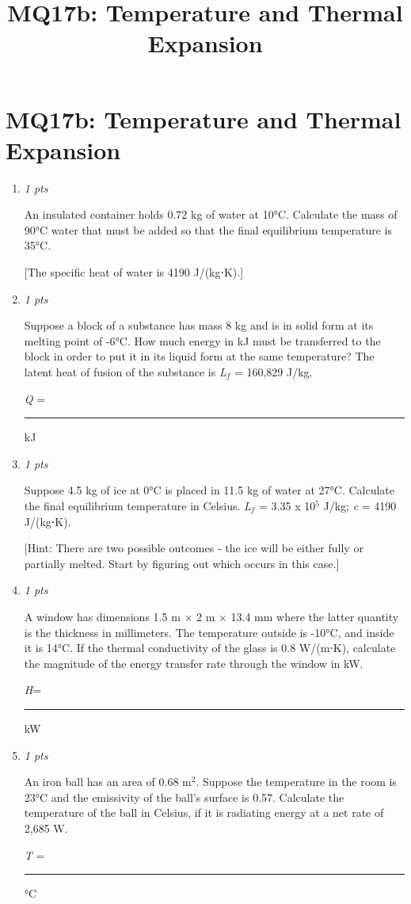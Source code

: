 \documentclass[11pt]{article}
\title{MQ17b: Temperature and Thermal Expansion}
\author{}
\date{}
\begin{document}
\maketitle

\section*{MQ17b: Temperature and Thermal Expansion}

\begin{enumerate}[leftmargin=*,label=\textbf{Question \arabic*.}]

\item \hfill \textit{1 pts}

An insulated container holds 0.72 kg of water at 10°C. Calculate the mass of 90°C water that must be added so that the final equilibrium temperature is 35°C.

[The specific heat of water is 4190 J/(kg⋅K).]

\item \hfill \textit{1 pts}

Suppose a block of a substance has mass 8 kg and is in solid form at its melting point of -6°C. How much energy in kJ must be transferred to the block in order to put it in its liquid form at the same temperature? The latent heat of fusion of the substance is \emph{L}$_{f}$ = 160,829 J/kg.



\emph{Q} = \rule{2.5cm}{0.4pt} kJ

\item \hfill \textit{1 pts}

Suppose 4.5 kg of ice at 0°C is placed in 11.5 kg of water at 27°C. Calculate the final equilibrium temperature in Celsius. \emph{L}$_{f}$ = 3.35 x 10$^{5}$ J/kg; \emph{c} = 4190 J/(kg⋅K).

[Hint: There are two possible outcomes - the ice will be either fully or partially melted. Start by figuring out which occurs in this case.]

\item \hfill \textit{1 pts}

A window has dimensions 1.5 m × 2 m × 13.4 mm where the latter quantity is the thickness in millimeters. The temperature outside is -10°C, and inside it is 14°C. If the thermal conductivity of the glass is 0.8  W/(m⋅K), calculate the magnitude of the energy transfer rate through the window in kW.



\emph{H}= \rule{2.5cm}{0.4pt} kW

\item \hfill \textit{1 pts}

An iron ball has an area of 0.68 m$^{2}$. Suppose the temperature in the room is 23°C and the emissivity of the ball's surface is 0.57. Calculate the temperature of the ball in Celsius, if it is radiating energy at a net rate of 2,685 W.\textbf{}



\emph{T} = \rule{2.5cm}{0.4pt} °C

\end{enumerate}
\end{document}
